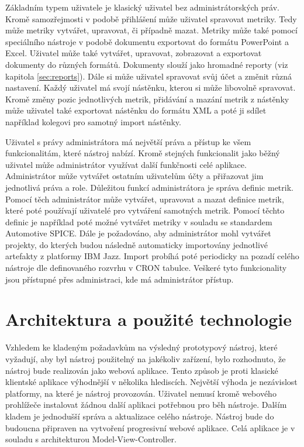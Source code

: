 \documentclass[czech,master]{diploma}
\begin{document}
Základním typem uživatele je klasický uživatel bez administrátorských práv. Kromě samozřejmosti v podobě přihlášení může uživatel spravovat metriky. Tedy může metriky vytvářet, upravovat, či případně mazat. Metriky může také pomocí speciálního nástroje v podobě dokumentu exportovat do formátu PowerPoint a Excel. Uživatel může také vytvářet, upravovat, zobrazovat a exportovat dokumenty do různých formátů. Dokumenty slouží jako hromadné reporty (viz kapitola \ref{sec:reports}). Dále si může uživatel spravovat svůj účet a změnit různá nastavení. Každý uživatel má svojí nástěnku, kterou si může libovolně spravovat. Kromě změny pozic jednotlivých metrik, přidávání a mazání metrik z nástěnky může uživatel také exportovat nástěnku do formátu XML a poté ji sdílet například kolegovi pro samotný import nástěnky.

Uživatel s právy administrátora má největší práva a přístup ke všem funkcionalitám, které nástroj nabízí. Kromě stejných funkcionalit jako běžný uživatel může administrátor využívat další funkčnosti celé aplikace. Administrátor může vytvářet ostatním uživatelům účty a přiřazovat jim jednotlivá práva a role. Důležitou funkcí administrátora je správa definic metrik. Pomocí těch administrátor může vytvářet, upravovat a mazat definice metrik, které poté používají uživatelé pro vytváření samotných metrik. Pomocí těchto definic je například poté možné vytvářet metriky v souladu se standardem Automotive SPICE. Dále je požadováno, aby administrátor mohl vytvářet projekty, do kterých budou následně automaticky importovány jednotlivé artefakty z platformy IBM Jazz. Import probíhá poté periodicky na pozadí celého nástroje dle definovaného rozvrhu v CRON tabulce. Veškeré tyto funkcionality jsou přístupné přes administraci, kde má administrátor přístup.

\section{Architektura a použité technologie}
Vzhledem ke kladeným požadavkům na výsledný prototypový nástroj, které vyžadují, aby byl nástroj použitelný na jakékoliv zařízení, bylo rozhodnuto, že nástroj bude realizován jako webová aplikace. Tento způsob je proti klasické klientské aplikace výhodnější v několika hlediscích. Největší výhoda je nezávislost platformy, na které je nástroj provozován. Uživatel nemusí kromě webového prohlížeče instalovat žádnou další aplikaci potřebnou pro běh nástroje. Dalším kladem je jednodušší správa a aktualizace celého nástroje. Nástroj bude do budoucna připraven na vytvoření progresivní webové aplikace. Celá aplikace je v souladu s architekturou Model-View-Controller.
\end{document}
